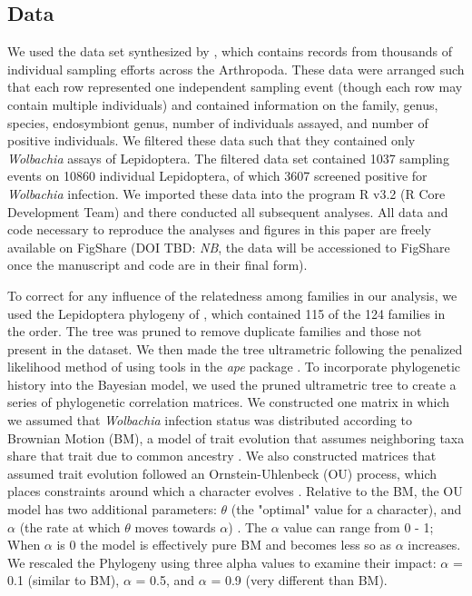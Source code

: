 \documentclass{frontiersSCNS} %
\begin{document}
\subsection{Data}
We used the data set synthesized by \citet{Weinert:2015aa}, which contains records from thousands of individual sampling efforts across the Arthropoda.  These data were arranged such that each row represented one independent sampling event (though each row may contain multiple individuals) and contained information on the family, genus, species, endosymbiont genus, number of individuals assayed, and number of positive individuals. We filtered these data such that they contained only \textit{Wolbachia} assays of Lepidoptera. The filtered data set contained 1037 sampling events on 10860 individual Lepidoptera, of which 3607 screened positive for \textit{Wolbachia} infection. We imported these data into the program R v3.2 (R Core Development Team) and there conducted all subsequent analyses. All data and code necessary to reproduce the analyses and figures in this paper are freely available on FigShare (DOI TBD: \textit{NB}, the data will be accessioned to FigShare once the manuscript and code are in their final form).

To correct for any influence of the relatedness among families in our analysis, we used the Lepidoptera phylogeny of \citet{Regier:2013fp}, which contained 115 of the 124 families in the order. The tree was pruned to remove duplicate families and those not present in the  \cite{Weinert:2015aa} dataset. We then made the tree ultrametric following the penalized likelihood method of \citet{Sanderson:2002vy} using tools in the \textit{ape} package \citep{Paradis:2004dv}. To incorporate phylogenetic history into the Bayesian model, we used the pruned ultrametric tree to create a series of phylogenetic correlation matrices. We constructed one matrix in which we assumed that \textit{Wolbachia} infection status was distributed according to Brownian Motion (BM), a model of trait evolution that assumes neighboring taxa share that trait due to common ancestry \citep{Paradis:2012wn}. We also constructed matrices that assumed trait evolution followed an Ornstein-Uhlenbeck (OU) process, which places constraints around which a character evolves \citep{Paradis:2012wn}. Relative to the BM, the OU model has two additional parameters: $\theta$ (the "optimal" value for a character), and $\alpha$ (the rate at which $\theta$ moves towards $\alpha$) \citep{Paradis:2012wn}. The $\alpha$ value can range from 0 - 1; When $\alpha$ is 0 the model is effectively pure BM and becomes less so as $\alpha$ increases. We rescaled the Phylogeny using three alpha values to examine their impact: $\alpha$ = 0.1 (similar to BM), $\alpha$ = 0.5, and $\alpha$ = 0.9 (very different than BM).
\end{document}

